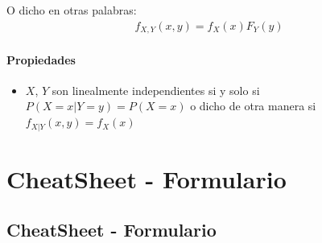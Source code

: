 \documentclass[12pt, fleqn]{report}                             %
\theoremstyle{break}                                            %
\begin{document}
            O dicho en otras palabras:
            \begin{align*}
                f_{X, Y}(x, y) = f_X(x) F_Y(y)
            \end{align*}


            \vspace{1em}
            \subsection{Propiedades}
                    
                \begin{itemize}
                    \item 
                        $X$, $Y$ son linealmente independientes
                        si y solo si $P(X = x | Y = y) = P(X = x)$
                        o dicho de otra manera si $f_{X |Y} (x, y) = f_X(x)$


                \end{itemize}







\part{CheatSheet - Formulario}
\clearpage


    \chapter{CheatSheet - Formulario}


        \clearpage
\end{document}
